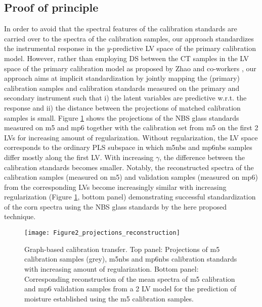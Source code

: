\documentclass{article}
\begin{document}
\subsection{Proof of principle}
In order to avoid that the spectral features of the calibration standards are carried over to the spectra of the calibration samples, our approach standardizes the instrumental response in the $y$-predictive LV space of the primary calibration model. However, rather than employing DS between the CT samples in the LV space of the primary calibration model as proposed by Zhao and co-workers \cite{Zhao2019}, our approach aims at implicit standardization by jointly mapping the (primary) calibration samples and calibration standards measured on the primary and secondary instrument such that i) the latent variables are predictive w.r.t. the response and ii) the distance between the projections of matched calibration samples is small. Figure \ref{fig:figure2gct} shows the projections of the NBS glass standards measured on m5 and mp6 together with the calibration set from m5 on the first 2 LVs for increasing amount of regularization. Without regularization, the LV space corresponds to the ordinary PLS subspace in which m5nbs and mp6nbs samples differ mostly along the first LV. With increasing $\gamma$, the difference between the calibration standards becomes smaller. Notably, the reconstructed spectra of the calibration samples (measured on m5) and validation samples (measured on mp6) from the corresponding LVs become increasingly similar with increasing regularization (Figure \ref{fig:figure2gct}, bottom panel) demonstrating successful standardization of the corn spectra using the NBS glass standards by the here proposed technique.  
\begin{figure}[h!]
	\centering
	\texttt{[image: Figure2\_projections\_reconstruction]}
	\caption{Graph-based calibration transfer. Top panel: Projections of m5 calibration samples (grey), m5nbs and mp6nbs calibration standards with increasing amount of regularization. Bottom panel: Corresponding reconstruction of the mean spectra of m5 calibration and mp6 validation samples from a 2 LV model for the prediction of moisture established using the m5 calibration samples.}
	\label{fig:figure2gct}
\end{figure}
\end{document}
